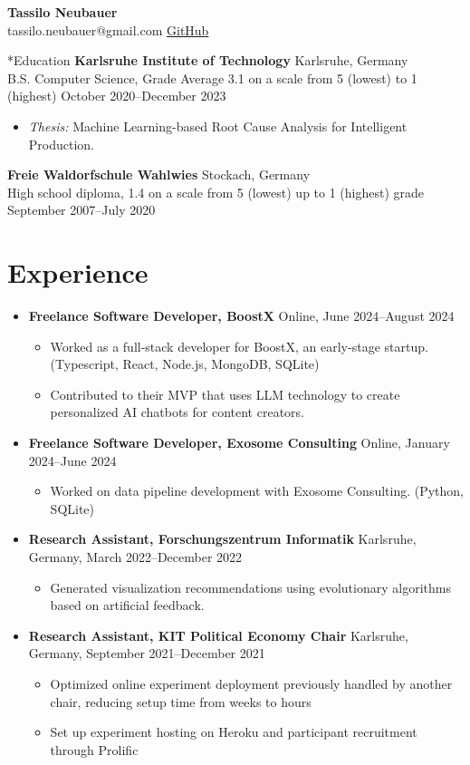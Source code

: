 \documentclass[letterpaper,10pt]{article}
\newcommand{\header}[4]{
    \begin{center}
        \textbf{\Huge{#1}}\\
        \small{
            \textcolor{accent}{#2} \hspace{1em}
            \href{#3}{GitHub}
        }
    \end{center}
}
\begin{document}
\header{Tassilo Neubauer}{tassilo.neubauer@gmail.com}{https://github.com/sonofhypnos}

\section*{Education}
\textbf{Karlsruhe Institute of Technology} \hfill Karlsruhe, Germany \\
B.S. Computer Science, Grade Average 3.1 on a scale from 5 (lowest) to 1 (highest) \hfill October 2020--December 2023
\begin{itemize}
    \item \textit{Thesis:} Machine Learning-based Root Cause Analysis for Intelligent Production.
\end{itemize}
\textbf{Freie Waldorfschule Wahlwies} \hfill Stockach, Germany \\
High school diploma,  1.4 on a scale from 5 (lowest) up to 1 (highest) grade \hfill September 2007--July 2020


\section*{Experience}
\begin{itemize}
    \item \textbf{Freelance Software Developer, BoostX} \hfill Online, June 2024--August 2024
    \begin{itemize}
       \item Worked as a full-stack developer for BoostX, an early-stage startup. (Typescript, React, Node.js, MongoDB, SQLite)
       \item Contributed to their MVP that uses LLM technology to create personalized AI chatbots for content creators.
    \end{itemize}
    \item \textbf{Freelance Software Developer, Exosome Consulting} \hfill Online, January 2024--June 2024
    \begin{itemize}
       \item Worked on data pipeline development with Exosome Consulting. (Python, SQLite)
    \end{itemize}
    \item \textbf{Research Assistant, Forschungszentrum Informatik} \hfill Karlsruhe, Germany, March 2022--December 2022
    \begin{itemize}
        \item Generated visualization recommendations using evolutionary algorithms based on artificial feedback.
    \end{itemize}
    \item \textbf{Research Assistant, KIT Political Economy Chair} \hfill Karlsruhe, Germany, September 2021--December 2021
    \begin{itemize}
        \item Optimized online experiment deployment previously handled by another chair, reducing setup time from weeks to hours
        \item Set up experiment hosting on Heroku and participant recruitment through Prolific
    \end{itemize}
\end{itemize}
\end{document}
